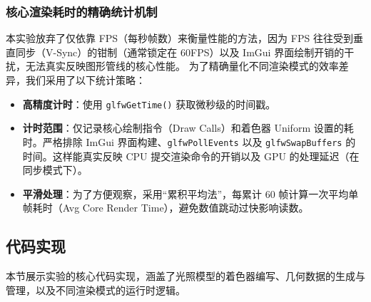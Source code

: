\documentclass[a4paper]{article}
\begin{document}
\subsubsection{核心渲染耗时的精确统计机制}

本实验放弃了仅依靠 FPS（每秒帧数）来衡量性能的方法，因为 FPS 往往受到垂直同步（V-Sync）的钳制（通常锁定在 60FPS）以及 ImGui 界面绘制开销的干扰，无法真实反映图形管线的核心性能。
为了精确量化不同渲染模式的效率差异，我们采用了以下统计策略：
\begin{itemize}
    \item \textbf{高精度计时}：使用 \texttt{glfwGetTime()} 获取微秒级的时间戳。
    \item \textbf{计时范围}：仅记录核心绘制指令（Draw Calls）和着色器 Uniform 设置的耗时。严格排除 ImGui 界面构建、\texttt{glfwPollEvents} 以及 \texttt{glfwSwapBuffers} 的时间。这样能真实反映 CPU 提交渲染命令的开销以及 GPU 的处理延迟（在同步模式下）。
    \item \textbf{平滑处理}：为了方便观察，采用“累积平均法”，每累计 60 帧计算一次平均单帧耗时（Avg Core Render Time），避免数值跳动过快影响读数。
\end{itemize}

\subsection{代码实现}
本节展示实验的核心代码实现，涵盖了光照模型的着色器编写、几何数据的生成与管理，以及不同渲染模式的运行时逻辑。
\end{document}

